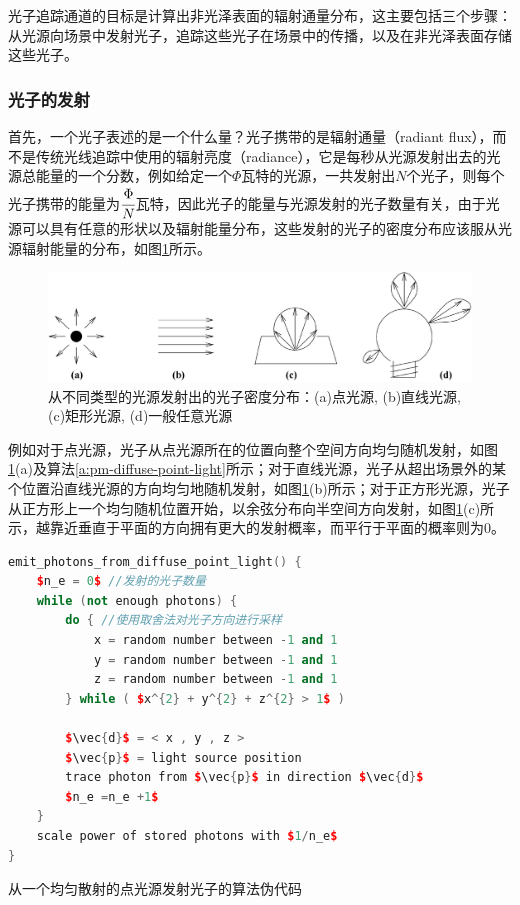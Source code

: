 光子追踪通道的目标是计算出非光泽表面的辐射通量分布，这主要包括三个步骤：从光源向场景中发射光子，追踪这些光子在场景中的传播，以及在非光泽表面存储这些光子。



\subsubsection{光子的发射}
首先，一个光子表述的是一个什么量？光子携带的是辐射通量（radiant flux），而不是传统光线追踪中使用的辐射亮度（radiance），它是每秒从光源发射出去的光源总能量的一个分数，例如给定一个$\Phi$瓦特的光源，一共发射出$N$个光子，则每个光子携带的能量为$ \cfrac{\Phi}{N}$瓦特，因此光子的能量与光源发射的光子数量有关，由于光源可以具有任意的形状以及辐射能量分布，这些发射的光子的密度分布应该服从光源辐射能量的分布，如图\ref{f:pm-photon-emission}所示。

\begin{figure}
	\includegraphics[width=1.0\textwidth]{figures/pm/pm-3}
	\caption{从不同类型的光源发射出的光子密度分布：(a)点光源, (b)直线光源, (c)矩形光源, (d)一般任意光源}
	\label{f:pm-photon-emission}
\end{figure}

例如对于点光源，光子从点光源所在的位置向整个空间方向均匀随机发射，如图\ref{f:pm-photon-emission}(a)及算法\ref{a:pm-diffuse-point-light}所示；对于直线光源，光子从超出场景外的某个位置沿直线光源的方向均匀地随机发射，如图\ref{f:pm-photon-emission}(b)所示；对于正方形光源，光子从正方形上一个均匀随机位置开始，以余弦分布向半空间方向发射，如图\ref{f:pm-photon-emission}(c)所示，越靠近垂直于平面的方向拥有更大的发射概率，而平行于平面的概率则为0。

\begin{algorithm}
\begin{lstlisting}[language=C++, mathescape]
emit_photons_from_diffuse_point_light() {
	$n_e = 0$ //发射的光子数量
 	while (not enough photons) {
		do { //使用取舍法对光子方向进行采样
 			x = random number between -1 and 1
			y = random number between -1 and 1
			z = random number between -1 and 1
		} while ( $x^{2} + y^{2} + z^{2} > 1$ )
 			
		$\vec{d}$ = < x , y , z >
		$\vec{p}$ = light source position
		trace photon from $\vec{p}$ in direction $\vec{d}$ 
 		$n_e =n_e +1$
	}
	scale power of stored photons with $1/n_e$ 
}
\end{lstlisting}
\caption{从一个均匀散射的点光源发射光子的算法伪代码}
\label{a:pm-diffuse-point-light}
\end{algorithm}

